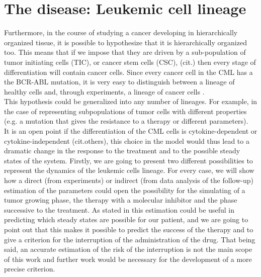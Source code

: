 \documentclass[a4paper,10pt]{article}
\begin{document}
\section{The disease: Leukemic cell lineage}
Furthermore, in the course of studying a cancer developing in hierarchically organized tissue,
it is possible to hypothesize that it is hierarchically organized too. This means that if we 
impose that
they are driven by a sub-population of
tumor initiating cells (TIC), or cancer stem cells (CSC), (cit.)
then every stage of differentiation will contain cancer cells.
Since every cancer cell in the CML has a the BCR-ABL mutation, 
it is very easy to distinguish  between
a lineage of healthy cells and,  through experiments, a lineage of cancer
cells \cite{michor2005, tang2011dynamics, olshen2014dynamics, rainero2018gdna}.\\
This hypothesis could be generalized into any number of lineages.
For example, in the case of representing subpopulations of tumor cells
with different properties (e.g. a mutation that gives the resistance to a therapy 
or different parameters).\\ 
It is an open point if the differentiation of the CML cells 
is cytokine-dependent or cytokine-independent
\cite{stiehl2018mathematical, van2007oncogenic,van2007aberrant} (cit.others), 
this choice in the model would thus lead to a dramatic change 
in the response to the treatment and to the possible steady states of the system.
Firstly, we are going to present two different possibilities to represent
the dynamics of the
leukemic cells lineage. 
For every case, we will show how a direct (from experiments) 
or indirect (from data analysis of the follow-up)
estimation of the parameters could open the possibility for the  simulating of  
a tumor growing phase, the therapy
with a molecular inhibitor and the phase successive to the treatment.
As stated in \cite{sottoriva, stiehl2018mathematical} this estimation
could be useful in predicting which steady states are possible for our patient,
and we are going to point out that this makes it 
possible to predict the success of the therapy
and to give a criterion for the interruption 
of the administration of the drug. 
That being said, an accurate estimation of the risk of the interruption 
is not the main scope of this work
and further work would be necessary for the development of a more precise criterion.\\ 
\end{document}

